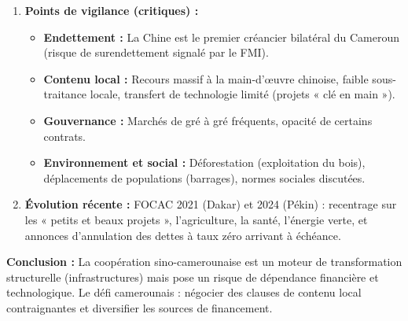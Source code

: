 \documentclass[11pt]{article}
\newcommand{\cle}[1]{{\popxbold\color{popdark}#1}}
\begin{document}
\begin{exoresolu}
\begin{enumerate}
\begin{itemize}
            \end{itemize}
        \item \textbf{Points de vigilance (critiques) :}
            \begin{itemize}
                \item \textbf{Endettement :} La Chine est le premier créancier bilatéral du Cameroun (risque de surendettement signalé par le FMI).
                \item \textbf{Contenu local :} Recours massif à la main-d'œuvre chinoise, faible sous-traitance locale, transfert de technologie limité (projets « clé en main »).
                \item \textbf{Gouvernance :} Marchés de gré à gré fréquents, opacité de certains contrats.
                \item \textbf{Environnement et social :} Déforestation (exploitation du bois), déplacements de populations (barrages), normes sociales discutées.
            \end{itemize}
        \item \textbf{Évolution récente :} FOCAC 2021 (Dakar) et 2024 (Pékin) : recentrage sur les « petits et beaux projets », l'agriculture, la santé, l'énergie verte, et annonces d'annulation des dettes à taux zéro arrivant à échéance.
    \end{enumerate}
    \textbf{Conclusion :} La coopération sino-camerounaise est un \cle{moteur de transformation structurelle} (infrastructures) mais pose un \cle{risque de dépendance financière et technologique}. Le défi camerounais : négocier des \cle{clauses de contenu local} contraignantes et diversifier les sources de financement.
\end{exoresolu}
\end{document}
